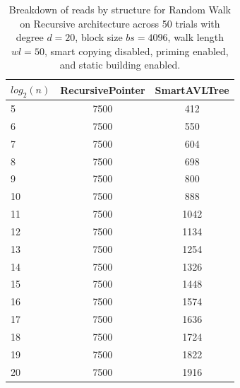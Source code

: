 \begin{table}[]
\centering
\begin{tabular}{|l|c|c|}
$log_2(n)$ & RecursivePointer & SmartAVLTree \\ \hline
5 & 7500 & 412 \\ \hline
6 & 7500 & 550 \\ \hline
7 & 7500 & 604 \\ \hline
8 & 7500 & 698 \\ \hline
9 & 7500 & 800 \\ \hline
10 & 7500 & 888 \\ \hline
11 & 7500 & 1042 \\ \hline
12 & 7500 & 1134 \\ \hline
13 & 7500 & 1254 \\ \hline
14 & 7500 & 1326 \\ \hline
15 & 7500 & 1448 \\ \hline
16 & 7500 & 1574 \\ \hline
17 & 7500 & 1636 \\ \hline
18 & 7500 & 1724 \\ \hline
19 & 7500 & 1822 \\ \hline
20 & 7500 & 1916 \\ \hline
\end{tabular}
\caption{Breakdown of reads by structure for Random Walk on Recursive architecture across 50 trials with degree $d=20$, block size $bs=4096$, walk length $wl=50$, smart copying disabled, priming enabled, and static building enabled.}
    \label{tab:reads_by_structure_rw_d20_bs4096_trials50_copiesfalse_primetrue_staticinsertiontrue_wl50_ptrecursive_movetrue}
\end{table}

